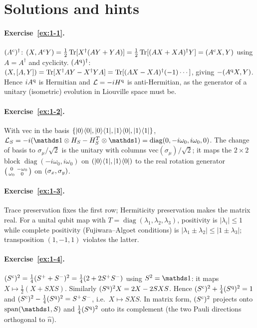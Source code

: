 \section{Solutions and hints}
\label{sec:solutions}

\paragraph{Exercise~\ref{ex:1-1}.}
$(A^{\mathrm{c}})^\dagger$: $(X,A^{\mathrm{c}} Y)=\tfrac12\operatorname{Tr}[X^\dagger(AY+YA)]=\tfrac12\operatorname{Tr}[(AX+XA)^\dagger Y]=(A^{\mathrm{c}} X,Y)$ using $A=A^\dagger$ and cyclicity.
$(A^{\mathrm{q}})^\dagger$: $(X,[A,Y])=\operatorname{Tr}[X^\dagger AY-X^\dagger YA]=\operatorname{Tr}[(AX-XA)^\dagger(-1)\cdots]$, giving $-(A^{\mathrm{q}} X,Y)$.
Hence $iA^{\mathrm{q}}$ is Hermitian and $\mathcal{L}=-iH^{\mathrm{q}}$ is anti-Hermitian, as the generator of a unitary (isometric) evolution in Liouville space must be.

\paragraph{Exercise~\ref{ex:1-2}.}
With $\mathrm{vec}$ in the basis $\{|0\rangle\langle0|,|0\rangle\langle1|,|1\rangle\langle0|,|1\rangle\langle1|\}$, $\Lc_S=-i(\Id\otimes H_S-H_S^T\otimes\Id)=\operatorname{diag}(0,-i\omega_0,i\omega_0,0)$.
The change of basis to $\sigma_\mu/\sqrt2$ is the unitary with columns $\mathrm{vec}(\sigma_\mu)/\sqrt2$; it maps the $2\times2$ block $\operatorname{diag}(-i\omega_0,i\omega_0)$ on $(|0\rangle\langle1|,|1\rangle\langle0|)$ to the real rotation generator $\begin{psmallmatrix}0&-\omega_0\\ \omega_0&0\end{psmallmatrix}$ on $(\sigma_x,\sigma_y)$.

\paragraph{Exercise~\ref{ex:1-3}.}
Trace preservation fixes the first row; Hermiticity preservation makes the matrix real.
For a unital qubit map with $T=\operatorname{diag}(\lambda_1,\lambda_2,\lambda_3)$, positivity is $|\lambda_i|\le1$ while complete positivity (Fujiwara--Algoet conditions) is $|\lambda_1\pm\lambda_2|\le|1\pm\lambda_3|$; transposition $(1,-1,1)$ violates the latter.

\paragraph{Exercise~\ref{ex:1-4}.}
$(S^{\mathrm{c}})^2=\tfrac14(S^{+}+S^{-})^2=\tfrac14(2+2S^+S^-)$ using $S^2=\Id$: it maps $X\mapsto\tfrac12(X+SXS)$.
Similarly $(S^{\mathrm{q}})^2X=2X-2SXS$.
Hence $(S^{\mathrm{c}})^2+\tfrac14(S^{\mathrm{q}})^2=1$ and $(S^{\mathrm{c}})^2-\tfrac14(S^{\mathrm{q}})^2=S^+S^-$, i.e.\ $X\mapsto SXS$.
In matrix form, $(S^{\mathrm{c}})^2$ projects onto $\mathrm{span}(\Id,S)$ and $\tfrac14(S^{\mathrm{q}})^2$ onto its complement (the two Pauli directions orthogonal to $\hat n$).

